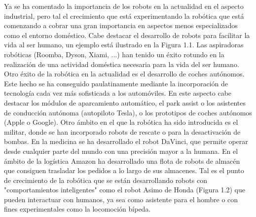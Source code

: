 Ya se ha comentado la importancia de los robots en la actualidad en el aspecto industrial, pero tal el crecimiento que está experimentando la robótica que está comenzando a cobrar una gran importancia en aspectos menos especializados como el entorno doméstico. Cabe destacar el desarrollo de robots para facilitar la vida al ser humano, un ejemplo está ilustrado en la Figura 1.1. Las aspiradoras robóticas (Roomba, Dyson, Xiami, ...) han tenido un éxito rotundo en la realización de una actividad doméstica necesaria para la vida del ser humano. Otro éxito de la robótica en la actualidad es el desarrollo de coches autónomos. Este hecho se ha conseguido paulatinamente mediante la incorporación de tecnología cada vez más sofisticada a los automóviles. En este aspecto cabe destacar los módulos de aparcamiento automático, el park assist o los asistentes de conducción autónoma (autopiloto Tesla), o los prototipos de coches autónomos (Apple o Google). Otro ámbito en el que la robótica ha sido introducida es el militar, donde se han incorporado robots de rescate o para la desactivación de bombas. En la medicina se ha desarrollado el robot DaVinci, que permite operar desde cualquier parte del mundo con una precisión mayor a la humana. En el ámbito de la logística Amazon ha desarrollado una flota de robots de almacén que consiguen trasladar los pedidos a lo largo de sus almacenes. Tal es el punto de crecimiento de la robótica que se están desarrollando robots con "comportamientos inteligentes" como el robot Asimo de Honda (Figura 1.2) que pueden interactuar con humanos, ya sea como asistente para el hombre o con fines experimentales como la locomoción bípeda.

